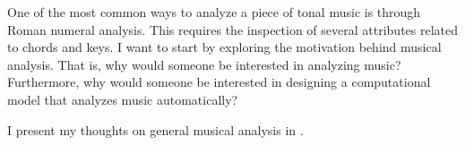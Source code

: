 

One of the most common ways to analyze a piece of tonal
music is through Roman numeral analysis. This requires the
inspection of several attributes related to chords and keys.
I want to start by exploring the motivation behind musical
analysis. That is, why would someone be interested in
analyzing music? Furthermore, why would someone be
interested in designing a computational model that analyzes
music automatically?

I present my thoughts on general musical analysis in
.

